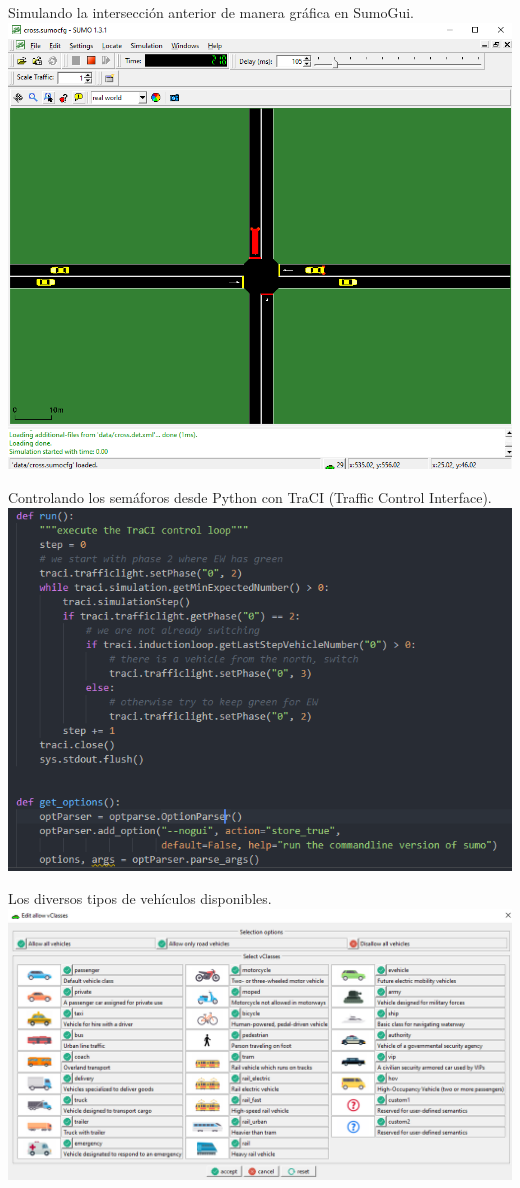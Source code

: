 Simulando la intersección anterior de manera gráfica en SumoGui.
\includegraphics[width=\textwidth]{sumo/f06ad63e2235a639007f9748f2326f91.png}

Controlando los semáforos desde Python con TraCI (Traffic Control
Interface).
\includegraphics[width=\textwidth]{sumo/8a185a540ef5e98b250d7c70216cddfc.png}

Los diversos tipos de vehículos disponibles.
\includegraphics[width=\textwidth]{sumo/d600ef6ce1de01e90d10a436d7b6bb75.png}

